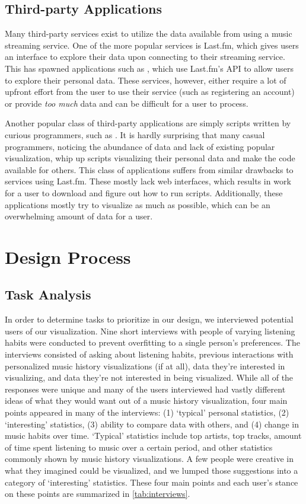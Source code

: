 \documentclass[journal]{vgtc}                %
\begin{document}
\subsection{Third-party Applications}

Many third-party services exist to utilize the data available from using a music streaming service. One of the more popular services is Last.fm, which gives users an interface to explore their data upon connecting to their streaming service. This has spawned applications such as \cite{Pre08,Dan12}, which use Last.fm's API to allow users to explore their personal data.
These services, however, either require a lot of upfront effort from the user to use their service (such as registering an account) or provide \emph{too much} data and can be difficult for a user to process.

Another popular class of third-party applications are simply scripts written by curious programmers, such as \cite{Boe16}. It is hardly surprising that many casual programmers, noticing the abundance of data and lack of existing popular visualization, whip up scripts visualizing their personal data and make the code available for others. This class of applications suffers from similar drawbacks to services using Last.fm. These mostly lack web interfaces, which results in work for a user to download and figure out how to run scripts. Additionally, these applications mostly try to visualize as much as possible, which can be an overwhelming amount of data for a user.

\section{Design Process}

\subsection{Task Analysis}

In order to determine tasks to prioritize in our design, we interviewed potential users of our visualization. Nine short interviews with people of varying listening habits were conducted to prevent overfitting to a single person's preferences. The interviews consisted of asking about listening habits, previous interactions with personalized music history visualizations (if at all), data they're interested in visualizing, and data they're not interested in being visualized. While all of the responses were unique and many of the users interviewed had vastly different ideas of what they would want out of a music history visualization, four main points appeared in many of the interviews: (1) `typical' personal statistics, (2) `interesting' statistics, (3) ability to compare data with others, and (4) change in music habits over time. 
`Typical' statistics include top artists, top tracks, amount of time spent listening to music over a certain period, and other statistics commonly shown by music history visualizations. A few people were creative in what they imagined could be visualized, and we lumped those suggestions into a category of `interesting' statistics. 
These four main points and each user's stance on these points are summarized in \autoref{tab:interviews}.
\end{document}
